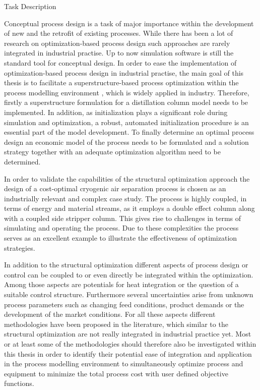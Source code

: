 \thispagestyle{plain}

\begin{center}
	\Large

	\vspace{2ex} Task Description
\end{center}

\normalsize

Conceptual process design is a task of major importance within the development of new and the retrofit
of existing processes. While there has been a lot of research on optimization-based process design such
approaches are rarely integrated in industrial practise. Up to now simulation software is still the standard
tool for conceptual design. In order to ease the implementation of optimization-based process design in
industrial practise, the main goal of this thesis is to facilitate a superstructure-based process optimization
within the process modelling environment \gproms, which is widely applied in industry. Therefore, firstly a
superstructure formulation for a distillation column model needs to be implemented. In addition, as initialization
plays a significant role during simulation and optimization, a robust, automated initialization procedure is an
essential part of the model development. To finally determine an optimal process design an economic model
of the process needs to be formulated and a solution strategy together with an adequate optimization
algorithm need to be determined.

In order to validate the capabilities of the structural optimization approach the design of a cost-optimal cryogenic
air separation process is chosen as an industrially relevant and complex case study. The process is highly coupled,
in terms of energy and material streams, as it employs a double effect column along with a coupled side stripper column.
This gives rise to challenges in terms of simulating and operating the process. Due to these complexities the process
serves as an excellent example to illustrate the effectiveness of optimization strategies.

In addition to the structural optimization different aspects of process design or control can be coupled to or even
directly be integrated within the optimization. Among those aspects are potentials for heat integration or the question
of a suitable control structure. Furthermore several uncertainties arise from unknown process parameters such as changing
feed conditions, product demands or the development of the market conditions. For all these aspects different methodologies
have been proposed in the literature, which similar to the structural optimization are not really integrated in industrial
practice yet.  Most or at least some of the methodologies should therefore also be investigated within this thesis in order
to identify their potential ease of integration and application in the process modelling environment \gproms to
simultaneously optimize process and equipment to minimize the total process cost with user defined objective functions.

